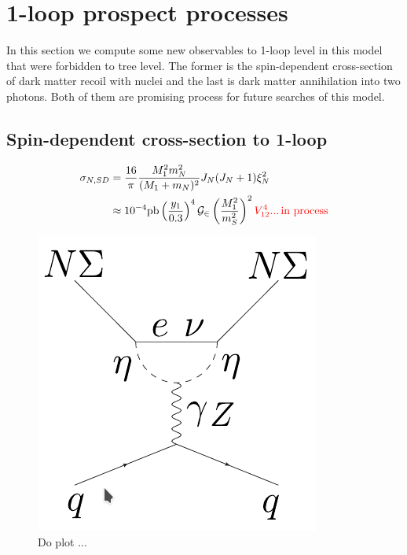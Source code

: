 \documentclass[12pt,letterpaper]{article}
\begin{document}
 







\section{1-loop prospect processes}
\label{sec:1-loop-processes}

In this section we compute some new observables to 1-loop level in this model that were forbidden to tree level. The former is the spin-dependent cross-section of dark matter recoil with nuclei and the last is dark matter annihilation into two photons. Both of them are promising process for future searches of this model.

\subsection{Spin-dependent cross-section to 1-loop}
\label{sec:sigma-SD}

\begin{align}
\label{eq:SD}
\sigma_{N,SD}&=\dfrac{16}{\pi}\dfrac{M_1^2m_N^2}{(M_1+m_N)^2}J_N(J_N+1)\xi_N^2 \nonumber \\
&\approx 10^{-4}\text{pb}\left(\dfrac{y_1}{0.3}\right)^4\mathcal{G_2}\left(\dfrac{M_1^2}{m_S^2}\right)^2 \color{red}{V_{12}^4} ...\, \text{in process}
\end{align}

%
\begin{figure}[h]
\begin{center}
\includegraphics[scale=0.5]{SD-diagram}
\caption{ {\color{red}Do plot ...} }
\label{fig:SD}
\end{center}
\end{figure}
%
 
\end{document}
